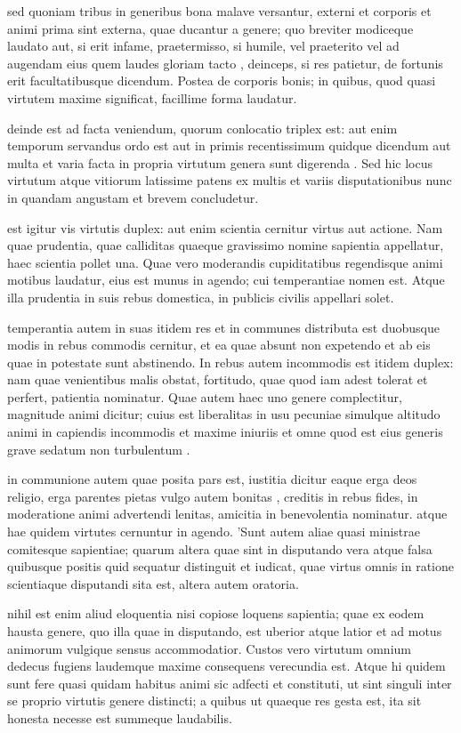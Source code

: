  sed quoniam tribus in generibus bona malave versantur, externi et corporis et animi prima sint externa, quae ducantur a genere; quo breviter modiceque laudato aut, si erit infame, praetermisso, si humile, vel praeterito vel ad augendam eius quem laudes gloriam tacto , deinceps, si res patietur, de fortunis erit facultatibusque dicendum. Postea de corporis bonis; in quibus, quod quasi virtutem maxime significat, facillime forma laudatur.

 deinde est ad facta veniendum, quorum conlocatio triplex est: aut enim temporum servandus ordo est aut in primis recentissimum quidque dicendum aut multa et varia facta in propria virtutum genera sunt digerenda . Sed hic locus virtutum atque vitiorum latissime patens ex multis et variis disputationibus nunc in quandam angustam et brevem concludetur.

 est igitur vis virtutis duplex: aut enim scientia cernitur virtus aut actione. Nam quae prudentia, quae calliditas quaeque gravissimo nomine sapientia appellatur, haec scientia pollet una. Quae vero moderandis cupiditatibus regendisque animi motibus laudatur, eius est munus in agendo; cui temperantiae nomen est. Atque illa prudentia in suis rebus domestica, in publicis civilis appellari solet.

 temperantia autem in suas itidem res et in communes distributa est duobusque modis in rebus commodis cernitur, et ea quae absunt non expetendo et ab eis quae in potestate sunt abstinendo. In rebus autem incommodis est itidem duplex: nam quae venientibus malis obstat, fortitudo, quae quod iam adest tolerat et perfert, patientia nominatur. Quae autem haec uno genere complectitur, magnitude animi dicitur; cuius est liberalitas in usu pecuniae simulque altitudo animi in capiendis incommodis et maxime iniuriis et omne quod est eius generis grave sedatum non turbulentum .

 in communione autem quae posita pars est, iustitia dicitur eaque erga deos religio, erga parentes pietas vulgo autem bonitas , creditis in rebus fides, in moderatione animi advertendi lenitas, amicitia in benevolentia nominatur. atque hae quidem virtutes cernuntur in agendo. 'Sunt autem aliae quasi ministrae comitesque sapientiae; quarum altera quae sint in disputando vera atque falsa quibusque positis quid sequatur distinguit et iudicat, quae virtus omnis in ratione scientiaque disputandi sita est, altera autem oratoria.

 nihil est enim aliud eloquentia nisi copiose loquens sapientia; quae ex eodem hausta genere, quo illa quae in disputando, est uberior atque latior et ad motus animorum vulgique sensus accommodatior. Custos vero virtutum omnium dedecus fugiens laudemque maxime consequens verecundia est. Atque hi quidem sunt fere quasi quidam habitus animi sic adfecti et constituti, ut sint singuli inter se proprio virtutis genere distincti; a quibus ut quaeque res gesta est, ita sit honesta necesse est summeque laudabilis.


